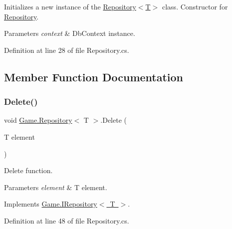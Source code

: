 Initializes a new instance of the \mbox{\hyperlink{class_game_1_1_repository_a4e05519fae5c877e6903dcd1c9c1994a}{Repository$<$\+T$>$}} class. Constructor for \mbox{\hyperlink{class_game_1_1_repository}{Repository}}. 


\begin{DoxyParams}{Parameters}
{\em context} & Db\+Context instance.\\
\hline
\end{DoxyParams}


Definition at line 28 of file Repository.\+cs.



\subsection{Member Function Documentation}
\mbox{\label{class_game_1_1_repository_a2fe431d36160d7457344d6f8023b19d9}} 
\subsubsection{\texorpdfstring{Delete()}{Delete()}}
{\footnotesize\ttfamily void \mbox{\hyperlink{class_game_1_1_repository}{Game.\+Repository}}$<$ T $>$.Delete (\begin{DoxyParamCaption}\item[{T}]{element }\end{DoxyParamCaption})}



Delete function. 


\begin{DoxyParams}{Parameters}
{\em element} & T element.\\
\hline
\end{DoxyParams}


Implements \mbox{\hyperlink{interface_game_1_1_i_repository_a756ad6d919f5ae70d0800a63227b77a0}{Game.\+I\+Repository$<$ T $>$}}.



Definition at line 48 of file Repository.\+cs.

\mbox{\label{class_game_1_1_repository_aea664d07612f5e08ceccd602a4b900da}} 
